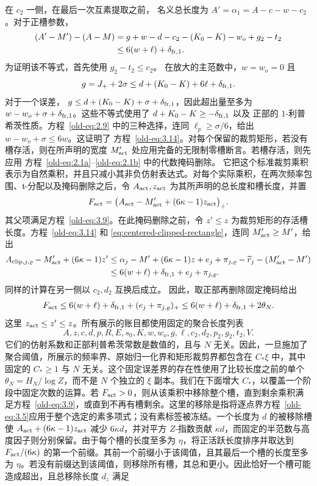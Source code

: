 \documentclass[11pt,a4paper]{article}
\numberwithin{equation}{section}
\numberwithin{figure}{section}
\theoremstyle{definition}
\theoremstyle{remark}
\begin{document}
在 \(c_2\) 一侧，在最后一次互素提取之前，
名义总长度为 \(A'=\alpha_1=A-c-w-c_2\)。对于正槽参数，
\begin{equation}
 \begin{split}
 (A'-M')-(A-M)
 &=g+w-d-c_2-(K_0-K)-w_o+g_2-t_2\\
 &\le6(w+\ell)+\delta_{{\rm fr},1}.
 \end{split}
 \label{old-eq:3.14}
\end{equation}
为证明该不等式，首先使用 \(g_2-t_2\le c_2\)。
在放大的主范数中，\(w=w_o=0\) 且
\[
 g=J_++2\sigma
 \le d+(K_0-K)+6\ell+\delta_{{\rm fr},1}.
\]
对于一个误差，
\(g\le d+(K_0-K)+\sigma+\delta_{{\rm fr},1}\)，因此超出量至多为
\(w-w_o+\sigma+\delta_{{\rm fr},1}\)。这些不等式使用了
\(d+K_0-K\ge-\delta_{{\rm fr},1}\) 以及
正部的 \(1\)-利普希茨性质。方程~\eqref{old-eq:2.9} 中的三种选择，连同
\(\ell_p\ge\sigma/6\)，给出
\(w-w_o+\sigma\le6w\)。这证明了
方程~\eqref{old-eq:3.14}。对每个保留的裁剪矩形，若没有槽存活，则在所声明的宽度
\(M'_{\rm act}\) 处应用完备的无限制零槽断言。若槽存活，则先应用
方程~\eqref{old-eq:2.1a}--\eqref{old-eq:2.1b} 中的代数掩码删除。
它把这个标准裁剪乘积表示为自然乘积，并且只减小其非负仿射表达式。对每个实际乘积，在两次频率包围、\(\mathfrak t\)-分配以及掩码删除之后，令
\(A_{\rm act},z_{\rm act}\) 为其所声明的总长度和槽长度，并置
\[
 F_{\rm act}
 =\bigl(A_{\rm act}-M'_{\rm act}+(6\kappa-1)z_{\rm act}\bigr)_+.
\]
其父项满足方程~\eqref{old-eq:3.9}。在此掩码删除之前，令 \(z'\le z\) 为裁剪矩形的存活槽长度。方程~\eqref{old-eq:3.14} 和
\eqref{eq:centered-clipped-rectangle}，连同 \(M'_{\rm act}\ge M'\)，给出
\[
 \begin{split}
 A_{{\rm clip},j,\varrho}-M'_{\rm act}+(6\kappa-1)z'
 &\le \alpha_j-M'+(6\kappa-1)z
       +e_j+\pi_{j,\varrho}-\widetilde r_j-(M'_{\rm act}-M')\\
 &\le6(w+\ell)+\delta_{{\rm fr},1}+e_j+\pi_{j,\varrho}.
 \end{split}
\]
同样的计算在另一侧以 \(c_2,d_2\) 互换后成立。
因此，取正部再删除固定掩码给出
\[
 F_{\rm act}\le6(w+\ell)+\delta_{{\rm fr},1}
                 +(e_j+\pi_{j,\varrho})_+
 \le6(w+\ell)+\delta_{{\rm fr},1}+2\theta_N.
\]
这里 \(z_{\rm act}\le z'\le z\)。所有展示的账目都使用固定的聚合长度列表
\[
 A,z,c,d,p,R,E,s_0,K,w,w_o,g,\ell,c_2,d_2,p_2,g_2,t_2,V.
\]
它们的仿射系数和正部利普希茨常数是数值的，且与 \(N\) 无关。因此，一旦施加了聚合阈值，所展示的频率界、原始归一化界和矩形裁剪界都包含在
\(C_*\xi\) 中，其中固定的 \(C_*\ge1\) 与 \(N\) 无关。这个固定误差界的存在性使用了比较长度之前的单个
\(\theta_N=H_N/\log Z\)，而不是 \(N\) 个独立的 \(\xi\) 副本。我们在下面增大 \(C_*\)，以覆盖一个阶段中固定次数的运算。若 \(F_{\rm act}>0\)，则从该乘积中移除整个槽，直到剩余乘积满足方程~\eqref{old-eq:3.9}，或直到不再有槽剩余。这里的移除是指将逐点界方程~\eqref{old-eq:3.5}应用于整个选定的素多项式；没有素标签被冻结。一个长度为 \(d\) 的被移除槽使 \(A_{\rm act}+(6\kappa-1)z_{\rm act}\) 减少 \(6\kappa d\)，并对平方 \(Z\)-指数贡献 \(\kappa d\)，而固定的半范数与高度因子则分别保留。由于每个槽的长度至多为 \(\eta\)，将正活跃长度排序并取达到 \(F_{\rm act}/(6\kappa)\) 的第一个前缀。其前一个前缀小于该阈值，且其最后一个槽的长度至多为 \(\eta\)。若没有前缀达到该阈值，则移除所有槽，其总和更小。因此恰好一个槽可能造成超出，且总移除长度 \(d_z\) 满足
\end{document}
